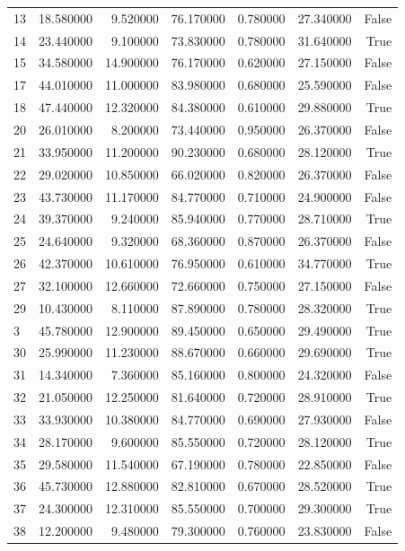 \begin{table}
\begin{tabular}{lrrrrrr}
13 & 18.580000 & 9.520000 & 76.170000 & 0.780000 & 27.340000 & False \\
14 & 23.440000 & 9.100000 & 73.830000 & 0.780000 & 31.640000 & True \\
15 & 34.580000 & 14.900000 & 76.170000 & 0.620000 & 27.150000 & False \\
17 & 44.010000 & 11.000000 & 83.980000 & 0.680000 & 25.590000 & False \\
18 & 47.440000 & 12.320000 & 84.380000 & 0.610000 & 29.880000 & True \\
20 & 26.010000 & 8.200000 & 73.440000 & 0.950000 & 26.370000 & False \\
21 & 33.950000 & 11.200000 & 90.230000 & 0.680000 & 28.120000 & True \\
22 & 29.020000 & 10.850000 & 66.020000 & 0.820000 & 26.370000 & False \\
23 & 43.730000 & 11.170000 & 84.770000 & 0.710000 & 24.900000 & False \\
24 & 39.370000 & 9.240000 & 85.940000 & 0.770000 & 28.710000 & True \\
25 & 24.640000 & 9.320000 & 68.360000 & 0.870000 & 26.370000 & False \\
26 & 42.370000 & 10.610000 & 76.950000 & 0.610000 & 34.770000 & True \\
27 & 32.100000 & 12.660000 & 72.660000 & 0.750000 & 27.150000 & False \\
29 & 10.430000 & 8.110000 & 87.890000 & 0.780000 & 28.320000 & True \\
3 & 45.780000 & 12.900000 & 89.450000 & 0.650000 & 29.490000 & True \\
30 & 25.990000 & 11.230000 & 88.670000 & 0.660000 & 29.690000 & True \\
31 & 14.340000 & 7.360000 & 85.160000 & 0.800000 & 24.320000 & False \\
32 & 21.050000 & 12.250000 & 81.640000 & 0.720000 & 28.910000 & True \\
33 & 33.930000 & 10.380000 & 84.770000 & 0.690000 & 27.930000 & False \\
34 & 28.170000 & 9.600000 & 85.550000 & 0.720000 & 28.120000 & True \\
35 & 29.580000 & 11.540000 & 67.190000 & 0.780000 & 22.850000 & False \\
36 & 45.730000 & 12.880000 & 82.810000 & 0.670000 & 28.520000 & True \\
37 & 24.300000 & 12.310000 & 85.550000 & 0.700000 & 29.300000 & True \\
38 & 12.200000 & 9.480000 & 79.300000 & 0.760000 & 23.830000 & False \\

\end{tabular}
\end{table}
